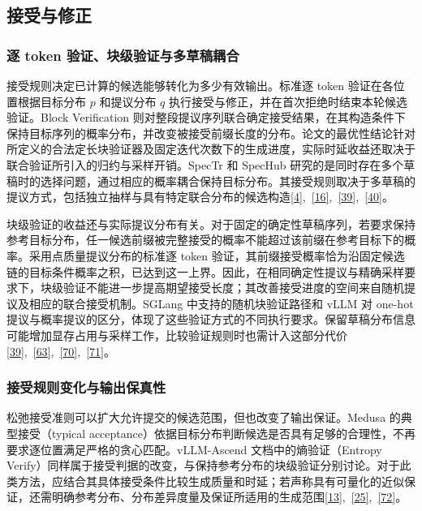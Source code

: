 \documentclass[11pt,a4paper,UTF8,fontset=none,scheme=plain,zihao=-4]{ctexart}
\begin{document}
\hypertarget{section-4-3}{%
\subsection{接受与修正}\label{section-4-3}}

\hypertarget{section-4-3-1}{%
\subsubsection{逐 token
验证、块级验证与多草稿耦合}\label{section-4-3-1}}

接受规则决定已计算的候选能够转化为多少有效输出。标准逐 token
验证在各位置根据目标分布 \(p\) 和提议分布 \(q\)
执行接受与修正，并在首次拒绝时结束本轮候选验证。Block Verification
则对整段提议序列联合确定接受结果，在其构造条件下保持目标序列的概率分布，并改变被接受前缀长度的分布。论文的最优性结论针对所定义的合法定长块验证器及固定迭代次数下的生成进度，实际时延收益还取决于联合验证所引入的归约与采样开销。SpecTr
和 SpecHub
研究的是同时存在多个草稿时的选择问题，通过相应的概率耦合保持目标分布。其接受规则取决于多草稿的提议方式，包括独立抽样与具有特定联合分布的候选构造\protect\hyperlink{ref-leviathan}{{[}4{]}},~\protect\hyperlink{ref-spectr}{{[}16{]}},~\protect\hyperlink{ref-blockverification}{{[}39{]}},~\protect\hyperlink{ref-spechub}{{[}40{]}}。

块级验证的收益还与实际提议分布有关。对于固定的确定性草稿序列，若要求保持参考目标分布，任一候选前缀被完整接受的概率不能超过该前缀在参考目标下的概率。采用点质量提议分布的标准逐
token
验证，其前缀接受概率恰为沿固定候选链的目标条件概率之积，已达到这一上界。因此，在相同确定性提议与精确采样要求下，块级验证不能进一步提高期望接受长度；其改善接受进度的空间来自随机提议及相应的联合接受机制。SGLang
中支持的随机块验证路径和 vLLM 对 one-hot
提议与概率提议的区分，体现了这些验证方式的不同执行要求。保留草稿分布信息可能增加显存占用与采样工作，比较验证规则时也需计入这部分代价\protect\hyperlink{ref-blockverification}{{[}39{]}},~\protect\hyperlink{ref-sglangdocs}{{[}63{]}},~\protect\hyperlink{ref-sglang-pin}{{[}70{]}},~\protect\hyperlink{ref-vllmconfigdocs}{{[}71{]}}。

\hypertarget{section-4-3-2}{%
\subsubsection{接受规则变化与输出保真性}\label{section-4-3-2}}

松弛接受准则可以扩大允许提交的候选范围，但也改变了输出保证。Medusa
的典型接受（typical
acceptance）依据目标分布判断候选是否具有足够的合理性，不再要求逐位置满足严格的贪心匹配。vLLM-Ascend
文档中的熵验证（Entropy
Verify）同样属于接受判据的改变，与保持参考分布的块级验证分别讨论。对于此类方法，应结合其具体接受条件比较生成质量和时延；若声称具有可量化的近似保证，还需明确参考分布、分布差异度量及保证所适用的生成范围\protect\hyperlink{ref-zhao2026survey}{{[}13{]}},~\protect\hyperlink{ref-medusa}{{[}25{]}},~\protect\hyperlink{ref-ascenddocs}{{[}72{]}}。
\end{document}
